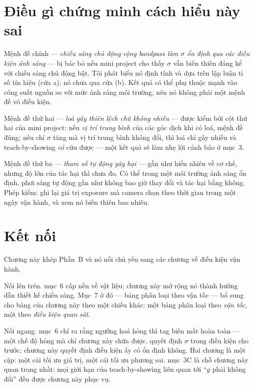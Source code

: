 \documentclass[../../marker.tex]{subfiles}
\begin{document}
\section{Điều gì chứng minh cách hiểu này sai}

Mệnh đề chính --- \emph{chiếu sáng chủ động cộng bandpass làm \(\sigma\) ổn định qua các điều kiện ánh sáng} --- bị bác bỏ nếu mini project cho thấy \(\sigma\) vẫn biến thiên đáng kể với chiếu sáng chủ động bật. Tôi phát biểu nó định tính và dựa trên lập luận tỉ số tín hiệu (cửa a); nó chưa qua cửa (b). Kết quả có thể phụ thuộc mạnh vào công suất nguồn so với mức ánh sáng môi trường, nên nó không phải một mệnh đề vô điều kiện.

Mệnh đề thứ hai --- \emph{loá gây thiên lệch chứ không nhiễu} --- được kiểm bởi cột thứ hai của mini project: nếu \emph{vị trí trung bình} của các góc dịch khi có loá, mệnh đề đúng; nếu chỉ \(\sigma\) tăng mà vị trí trung bình không đổi, thì loá chỉ gây nhiễu và teach-by-showing \emph{có} cứu được --- một kết quả sẽ làm nhẹ lời cảnh báo ở mục~3.

Mệnh đề thứ ba --- \emph{tham số tự động gây hại} --- gần như hiển nhiên về cơ chế, nhưng độ lớn của tác hại thì chưa đo. Có thể trong một môi trường ánh sáng ổn định, phơi sáng tự động gần như không bao giờ thay đổi và tác hại bằng không. Phép kiểm: ghi lại giá trị exposure mà camera chọn theo thời gian trong một ngày vận hành, và xem nó biến thiên bao nhiêu.

\section{Kết nối}

Chương này khép Phần~B và nó nối chủ yếu sang các chương về điều kiện vận hành.

Nối lên trên.  mục~6 cấp nền về vật liệu; chương này mở rộng nó thành hướng dẫn thiết kế chiếu sáng. Mục~7 ở đó --- bảng phân loại theo vận tốc --- bổ sung cho bảng của chương này theo một chiều khác: một bảng phân loại theo \emph{vận tốc}, một theo \emph{điều kiện quan sát}.

Nối ngang.  mục~6 chỉ ra rằng ngưỡng hoá hỏng thì tag biến mất hoàn toàn --- một chế độ hỏng mà chỉ chương này chữa được.  quyết định \(\sigma\) trong điều kiện cho trước; chương này quyết định điều kiện ấy có ổn định không. Hai chương là một cặp: một cái tối ưu giá trị, một cái tối ưu phương sai.  mục~3C là chỗ chương này quan trọng nhất: mọi giới hạn của teach-by-showing liên quan tới ``\(g\) phải không đổi'' đều được chương này phục vụ.
\end{document}
